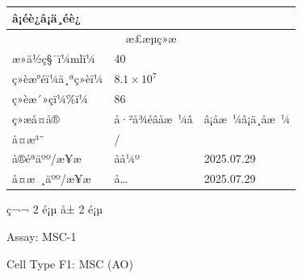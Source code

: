 \documentclass[UTF8,10pt,a4paper,fontset=fandol]{ctexart}
\newcommand{\fieldvalue}[1]{#1}
\newcommand{\handwritten}[1]{#1}
\begin{document}
\begin{center}
\begin{center}
\begin{tabularx}{\textwidth}{|l|X|l|X|}
\multicolumn{2}{l|}{â¡éè¿\qquad â¡ä¸éè¿} \\
\hline
\multicolumn{4}{|c|}{æ£æµç»æ} \\
\hline
æ»ä½ç§¯ï¼mlï¼ &
\multicolumn{3}{l|}{%
\fieldvalue{\handwritten{40}}} \\
\hline
ç»èæ°éï¼ä¸ªç»èï¼ &
\multicolumn{3}{l|}{%
\fieldvalue{\handwritten{$8.1\times10^{7}$}}} \\
\hline
ç»èæ´»çï¼\%ï¼ &
\multicolumn{3}{l|}{%
\fieldvalue{\handwritten{86}}} \\
\hline
ç»æå¤å® &
\multicolumn{1}{c|}{%
\fieldvalue{\handwritten{å·²å¾éâåæ ¼â}}} &
\multicolumn{2}{l|}{â¡åæ ¼\qquad â¡ä¸åæ ¼} \\
\hline
å¤æ³¨ &
\multicolumn{3}{l|}{%
\fieldvalue{\handwritten{/}}} \\
\hline
å®éªäºº/æ¥æ &
\multicolumn{1}{l|}{%
\fieldvalue{\handwritten{å­å¼º}}} &
\multicolumn{2}{l|}{%
\fieldvalue{\handwritten{2025.07.29}}} \\
\hline
å¤æ ¸äºº/æ¥æ &
\multicolumn{1}{l|}{%
\fieldvalue{\handwritten{å­\ldots}}} &
\multicolumn{2}{l|}{%
\fieldvalue{\handwritten{2025.07.29}}} \\
\hline
\end{tabularx}

\bigskip
\begin{center}
ç¬¬ 2 é¡µ å± 2 é¡µ
\end{center}

\newpage

Assay: %
\fieldvalue{MSC-1}

Cell Type F1: %
\fieldvalue{MSC (AO)}


\end{center}
\end{center}
\end{document}
